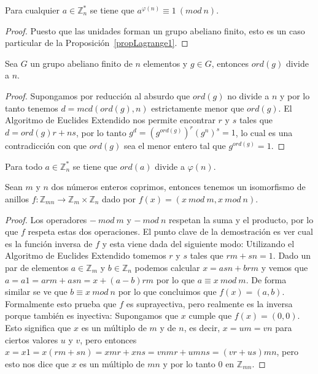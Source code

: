 \begin{theorem}[de Euler]
Para cualquier $a \in {\mathbb Z}_n^*$ se tiene que $a^{\varphi(n)} \equiv 1 ~(mod~n)$.
\end{theorem}
\begin{proof}
Puesto que las unidades forman un grupo abeliano finito, esto es un caso particular
de la Proposici\'on~\ref{propLagrange1}.
\end{proof}

\begin{proposition}
Sea $G$ un grupo abeliano finito de $n$ elementos y $g \in G$, entonces $ord(g)$ divide a $n$.
\end{proposition}
\begin{proof}
Supongamos por reducci\'on al absurdo que $ord(g)$ no divide a $n$ y por lo tanto tenemos $d = mcd(ord(g),n)$ estrictamente menor que $ord(g)$.
El Algoritmo de Euclides Extendido nos permite encontrar $r$ y $s$ tales que $d = ord(g)r+ns$, por lo tanto $g^d = (g^{ord(g)})^r(g^n)^s = 1$, lo cual es una contradicci\'on con
que $ord(g)$ sea el menor entero tal que $g^{ord(g)} = 1$.
\end{proof}

\begin{corollary}
Para todo $a \in {\mathbb Z}_n^*$ se tiene que $ord(a)$ divide a $\varphi(n)$.
\end{corollary}

\begin{theorem} Sean $m$ y $n$ dos n\'umeros enteros
coprimos, entonces tenemos un isomorfismo de anillos $f : {\mathbb Z}_{mn} \to {\mathbb Z}_m \times {\mathbb Z}_n$ dado por
$f(x) = (x~mod~m, x~mod~n)$.
\end{theorem}
\begin{proof}
Los operadores $-~mod~m$ y $-~mod~n$ respetan la suma y el producto, por lo que
$f$ respeta estas dos operaciones. El punto clave de la demostraci\'on es ver cual es
la funci\'on inversa de $f$ y esta viene dada del siguiente modo: Utilizando el Algoritmo
de Euclides Extendido tomemos $r$ y $s$ tales que $rm+sn =1$. Dado un par de elementos
$a \in {\mathbb Z}_m$ y $b \in {\mathbb Z}_n$ podemos calcular $x = asn+brm$ y vemos que
$a = a1 = arm+asn = x + (a-b)rm$ por lo que $a \equiv x~mod~m$. De forma similar se ve
que $b \equiv x~mod~n$ por lo que concluimos que $f(x) = (a,b)$. Formalmente esto prueba que
$f$ es suprayectiva, pero realmente es la inversa porque tambi\'en es inyectiva: Supongamos
que $x$ cumple que $f(x) = (0,0)$. Esto significa que $x$ es un m\'ultiplo de $m$ y de $n$, es
decir, $x = um = vn$ para ciertos valores $u$ y $v$, pero entonces $x = x1 = x(rm+sn) =
xmr + xns = vnmr+umns = (vr+us)mn$, pero esto nos dice que $x$ es un m\'ultiplo de $mn$ y
por lo tanto $0$ en ${\mathbb Z}_{mn}$.
\end{proof}

